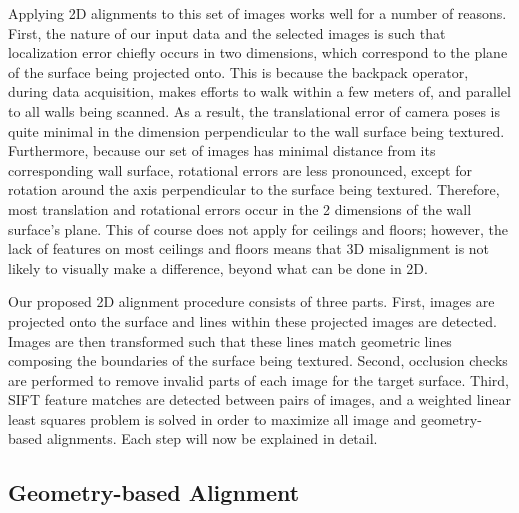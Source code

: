 \documentclass[]{spie}  %
\begin{document}
Applying 2D alignments to this set of images works well for a number
of reasons. First, the nature of our input data and the selected
images is such that localization error chiefly occurs in two
dimensions, which correspond to the plane of the surface being
projected onto. This is because the backpack operator, during data
acquisition, makes efforts to walk within a few meters of, and
parallel to all walls being scanned. As a result, the translational
error of camera poses is quite minimal in the dimension perpendicular
to the wall surface being textured. Furthermore, because our set of
images has minimal distance from its corresponding wall surface,
rotational errors are less pronounced, except for rotation around the
axis perpendicular to the surface being textured. Therefore, most
translation and rotational errors occur in the 2 dimensions of the
wall surface's plane. This of course does not apply for ceilings and
floors; however, the lack of features on most ceilings and floors
means that 3D misalignment is not likely to visually make a
difference, beyond what can be done in 2D.


Our proposed 2D alignment procedure consists of three parts. First,
images are projected onto the surface and lines within these projected
images are detected. Images are then transformed such that these lines
match geometric lines composing the boundaries of the surface being
textured. Second, occlusion checks are performed to remove invalid
parts of each image for the target surface. Third, SIFT feature
matches are detected between pairs of images, and a weighted linear
least squares problem is solved in order to maximize all image and
geometry-based alignments. Each step will now be explained in detail.


\subsection{Geometry-based Alignment}
\label{sec:geometryAlignment}
\end{document}
